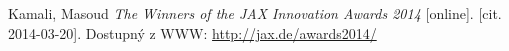 \begin{thebibliography}{10}

Kamali, Masoud \emph{The Winners of the JAX Innovation Awards 2014}
{[}online]. {[}cit. 2014-03-20]. Dostupný z WWW: \url{http://jax.de/awards2014/}

\end{thebibliography}

\cleardoublepage{}